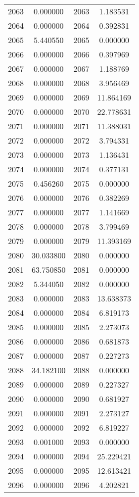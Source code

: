\documentclass[12pt]{article}
\begin{document}
\begin{longtable}{@{}cccc@{}}
2063 & 0.000000 & 2063 & 1.183531 \\
2064 & 0.000000 & 2064 & 0.392831 \\
2065 & 5.440550 & 2065 & 0.000000 \\
2066 & 0.000000 & 2066 & 0.397969 \\
2067 & 0.000000 & 2067 & 1.188769 \\
2068 & 0.000000 & 2068 & 3.956469 \\
2069 & 0.000000 & 2069 & 11.864169 \\
2070 & 0.000000 & 2070 & 22.778631 \\
2071 & 0.000000 & 2071 & 11.388031 \\
2072 & 0.000000 & 2072 & 3.794331 \\
2073 & 0.000000 & 2073 & 1.136431 \\
2074 & 0.000000 & 2074 & 0.377131 \\
2075 & 0.456260 & 2075 & 0.000000 \\
2076 & 0.000000 & 2076 & 0.382269 \\
2077 & 0.000000 & 2077 & 1.141669 \\
2078 & 0.000000 & 2078 & 3.799469 \\
2079 & 0.000000 & 2079 & 11.393169 \\
2080 & 30.033800 & 2080 & 0.000000 \\
2081 & 63.750850 & 2081 & 0.000000 \\
2082 & 5.344050 & 2082 & 0.000000 \\
2083 & 0.000000 & 2083 & 13.638373 \\
2084 & 0.000000 & 2084 & 6.819173 \\
2085 & 0.000000 & 2085 & 2.273073 \\
2086 & 0.000000 & 2086 & 0.681873 \\
2087 & 0.000000 & 2087 & 0.227273 \\
2088 & 34.182100 & 2088 & 0.000000 \\
2089 & 0.000000 & 2089 & 0.227327 \\
2090 & 0.000000 & 2090 & 0.681927 \\
2091 & 0.000000 & 2091 & 2.273127 \\
2092 & 0.000000 & 2092 & 6.819227 \\
2093 & 0.001000 & 2093 & 0.000000 \\
2094 & 0.000000 & 2094 & 25.229421 \\
2095 & 0.000000 & 2095 & 12.613421 \\
2096 & 0.000000 & 2096 & 4.202821 \\

\end{longtable}
\end{document}
